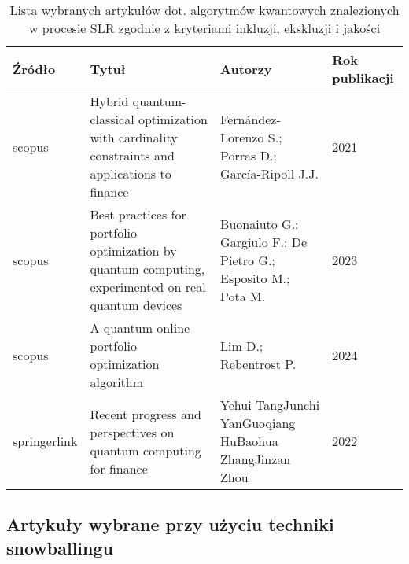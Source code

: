 \documentclass[polish,envcountsect,10pt]{article}
\begin{document}
\begin{table}[H]
	\caption{Lista wybranych artykułów dot. algorytmów kwantowych znalezionych w procesie SLR zgodnie z kryteriami inkluzji, ekskluzji i jakości}
	\centering
	\begin{tabular}{|p{2cm}|p{6cm}|p{3cm}|p{2cm}|}
		\hline
		Źródło       & Tytuł                                                                                                & Autorzy                                                       & Rok publikacji \\
		\hline
		scopus       & Hybrid quantum-classical optimization with cardinality constraints and applications to finance       & Fernández-Lorenzo S.; Porras D.; García-Ripoll J.J.           & 2021           \\
		\hline
		scopus       & Best practices for portfolio optimization by quantum computing, experimented on real quantum devices & Buonaiuto G.; Gargiulo F.; De Pietro G.; Esposito M.; Pota M. & 2023           \\
		\hline
		scopus       & A quantum online portfolio optimization algorithm                                                    & Lim D.; Rebentrost P.                                         & 2024           \\
		\hline
		springerlink & Recent progress and perspectives on quantum computing for finance                                    & Yehui TangJunchi YanGuoqiang HuBaohua ZhangJinzan Zhou        & 2022           \\
		\hline
	\end{tabular}
\end{table}

\subsection{Artykuły wybrane przy użyciu techniki snowballingu}
\end{document}
